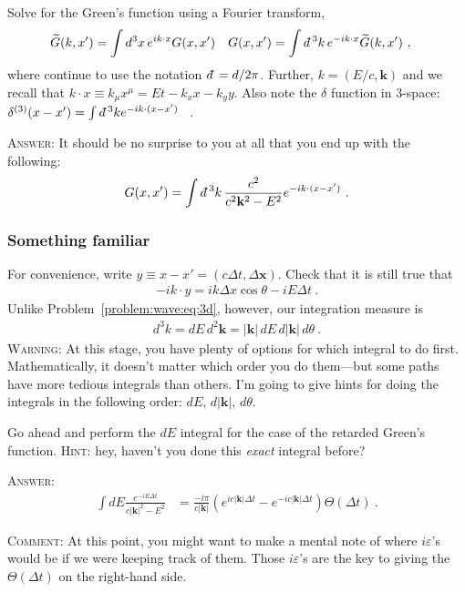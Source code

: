 \documentclass[12pt]{article}
\numberwithin{equation}{subsection}    %
\renewcommand{\tilde}{\widetilde}   %
\renewcommand{\vec}[1]{\mathbf{#1}} %
\newcommand{\dbar}{d\mkern-6mu\mathchar'26}    %
\begin{document}
Solve for the Green's function using a Fourier transform,
\begin{align}
	\tilde G(k,x') &= \int d^3x \, e^{ik\cdot x} G(x,x')
	&
	G(x,x') &= \int \dbar^3k \, e^{-ik\cdot x} \tilde G(k,x') \ ,
\end{align}
where continue to use the notation $\dbar = d/2\pi$. Further, $k = (E/c,\vec k)$ and we recall that $k\cdot x \equiv k_\mu x^\mu = Et - k_x x - k_y y$. Also note the $\delta$ function in 3-space: $\delta^{(3)}(x-x') = \int \dbar^3 k e^{-ik\cdot (x-x')}$ \ .

\textsc{Answer:} It should be no surprise to you at all that you end up with the following:
\begin{align}
	G(x,x') = \int \dbar^3k \, \frac{c^2}{c^2 \vec k^2 - E^2} e^{-ik\cdot (x-x')} \ .
	\label{eq:G:ft}
\end{align} 


\subsubsection{Something familiar}

For convenience, write $y \equiv x-x' = (c\Delta t,\Delta\vec{x})$. Check that it is still true that
\begin{align}
	-ik\cdot y = i k \Delta x \cos \theta  - i E \Delta t \ .
\end{align}
Unlike Problem~\ref{problem:wave:eq:3d}, however, our integration measure is
\begin{align}
	d^3 k = dE \, d^2\vec k = |\vec k| \,dE \,  d|\vec k| \, d \theta  \ .
\end{align}
\textsc{Warning:} At this stage, you have plenty of options for which integral to do first. Mathematically, it doesn't matter which order you do them---but some paths have more tedious integrals than others. I'm going to give hints for doing the integrals in the following order: $dE$, $d|\vec k|$, $d\theta$. 


Go ahead and perform the $dE$ integral for the case of the retarded Green's function. \textsc{Hint}: hey, haven't you done this \emph{exact} integral before? 

\textsc{Answer}:
\begin{align}
\int dE \frac{e^{-iE\Delta t}}{c|\vec k|^2 -E^2}
&=
\frac{-i\pi}{c|\vec k|} 
\left(
e^{ic|\vec k| \Delta t}
-
e^{-ic|\vec k| \Delta t}
\right) \Theta(\Delta t) \ .
\label{eq:dE}
\end{align}

\textsc{Comment}: At this point, you might want to make a mental note of where $i\varepsilon$'s would be if we were keeping track of them. Those $i\varepsilon$'s are the key to giving the $\Theta(\Delta t)$ on the right-hand side.
\end{document}
